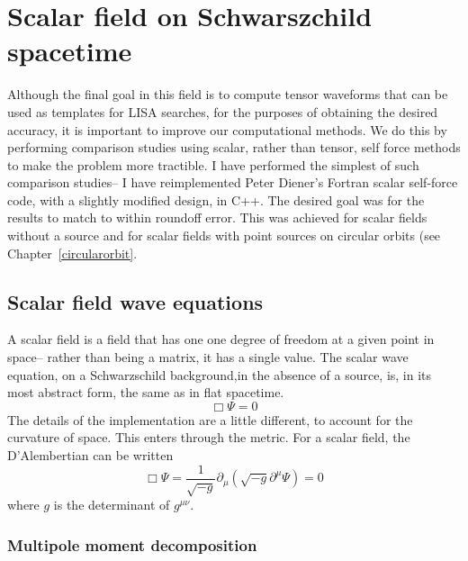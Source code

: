 \section{Scalar field on Schwarszchild spacetime}
Although the final goal in this field is to compute tensor waveforms that can be used as templates for LISA searches, for the purposes of obtaining the desired accuracy, it is important to improve our computational methods. We do this by performing comparison studies using scalar, rather than tensor, self force methods to make the problem more tractible. I have performed the simplest of such comparison studies-- I have reimplemented Peter Diener's Fortran scalar self-force code, with a slightly modified design, in C++. The desired goal was for the results to match to within roundoff error. This was achieved for scalar fields without a source and for scalar fields with point sources on circular orbits (see Chapter~\ref{circularorbit}.


\subsection{Scalar field wave equations}
A scalar field is a field that has one one degree of freedom at a given point in space-- rather than being a matrix, it has a single value. The scalar wave equation, on a Schwarzschild background,in the absence of a source, is, in its most abstract form, the same as in flat spacetime. 
\begin{equation}
  \Box\Psi=0
\end{equation}
The details of the implementation are a little different, to account for the curvature of space. This enters through the metric. For a scalar field, the D'Alembertian can be written
\begin{equation}
  \Box\Psi=\frac{1}{\sqrt{-g}}\partial_\mu(\sqrt{-g}\partial^\mu\Psi)=0
\end{equation}
where $g$ is the determinant of $g^{\mu\nu}$.~\cite{Wald} 

\subsubsection{Multipole moment decomposition}

